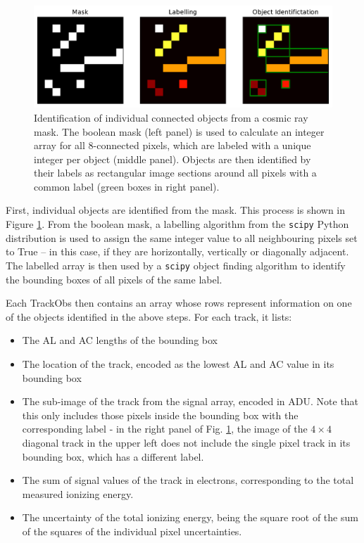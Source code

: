 \documentclass[a4paper, 11pt]{article}
\begin{document}
\begin{figure}
  \centering
  \includegraphics[width=\textwidth]{images/extraction/TrackObs_Objects}
  \caption{Identification of individual connected objects from a cosmic ray mask. The boolean mask (left panel) is used to calculate an integer array for all 8-connected pixels, which are labeled with a unique integer per object (middle panel). Objects are then identified by their labels as rectangular image sections around all pixels with a common label (green boxes in right panel).}
  \label{fig:TrackObs_Objects}
\end{figure}

First, individual objects are identified from the mask. This process is shown in Figure \ref{fig:TrackObs_Objects}. From the boolean mask, a labelling algorithm from the \texttt{scipy} Python distribution is used to assign the same integer value to all neighbouring pixels set to True -- in this case, if they are horizontally, vertically or diagonally adjacent. The labelled array is then used by a \texttt{scipy} object finding algorithm to identify the bounding boxes of all pixels of the same label.

Each TrackObs then contains an array whose rows represent information on one of the objects identified in the above steps. For each track, it lists:
\begin{itemize}
  \item The AL and AC lengths of the bounding box
  \item The location of the track, encoded as the lowest AL and AC value in its bounding box
  \item The sub-image of the track from the signal array, encoded in ADU. Note that this only includes those pixels inside the bounding box with the corresponding label - in the right panel of Fig. \ref{fig:TrackObs_Objects}, the image of the $4 \times 4$ diagonal track in the upper left does not include the single pixel track in its bounding box, which has a different label.
  \item The sum of signal values of the track in electrons, corresponding to the total measured ionizing energy.
  \item The uncertainty of the total ionizing energy, being the square root of the sum of the squares of the individual pixel uncertainties.
\end{itemize}
\end{document}
